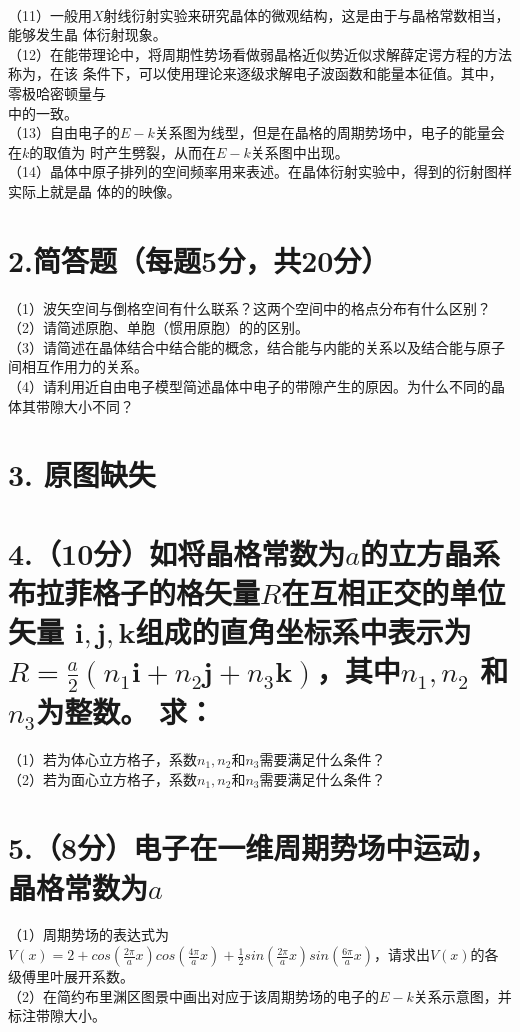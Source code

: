 \documentclass[UTF8]{ctexart}
\begin{document}
\underline{\makebox[3em]{}}\\
（11）一般用$X$射线衍射实验来研究晶体的微观结构，这是由于\underline{\makebox[7em]{}}与晶格常数相当，能够发生晶
体衍射现象。\\
（12）在能带理论中，将周期性势场看做弱晶格近似势近似求解薛定谔方程的方法称为\underline{\makebox[10em]{}}，在该
条件下，可以使用\underline{\makebox[3em]{}}理论来逐级求解电子波函数和能量本征值。其中，零极哈密顿量与\\
\underline{\makebox[12em]{}}中的一致。\\
（13）自由电子的$E-k$关系图为\underline{\makebox[3em]{}}线型，但是在晶格的周期势场中，电子的能量会在$k$的取值为
\underline{\makebox[19em]{}}时产生劈裂，从而在$E-k$关系图中出现\underline{\makebox[3em]{}}。\\
（14）晶体中原子排列的空间频率用\underline{\makebox[4em]{}}来表述。在晶体衍射实验中，得到的衍射图样实际上就是晶
体的\underline{\makebox[4em]{}}的映像。\\
\section*{\bfseries 2.简答题（每题5分，共20分）}
（1）波矢空间与倒格空间有什么联系？这两个空间中的格点分布有什么区别？\\
（2）请简述原胞、单胞（惯用原胞）的的区别。\\
（3）请简述在晶体结合中结合能的概念，结合能与内能的关系以及结合能与原子间相互作用力的关系。\\
（4）请利用近自由电子模型简述晶体中电子的带隙产生的原因。为什么不同的晶体其带隙大小不同？\\
\section*{\bfseries 3. 原图缺失}
\section*{\bfseries 4.（10分）如将晶格常数为$a$的立方晶系布拉菲格子的格矢量$R$在互相正交的单位矢量
$\bm{i},\bm{j},\bm{k}$组成的直角坐标系中表示为$R=\frac{a}{2}(n_1\bm{i}+n_2\bm{j}+n_3\bm{k})$，其中$n_1,n_2$
和$n_3$为整数。 求：}
（1）若为体心立方格子，系数$n_1,n_2$和$n_3$需要满足什么条件？\\
（2）若为面心立方格子，系数$n_1,n_2$和$n_3$需要满足什么条件？\\
\section*{\bfseries 5.（8分）电子在一维周期势场中运动，晶格常数为$a$}
（1）周期势场的表达式为$V(x)=2+cos(\frac{2\pi}{a}x)cos(\frac{4\pi}{a}x)
+\frac{1}{2}sin(\frac{2\pi}{a}x)sin(\frac{6\pi}{a}x)$，请求出$V(x)$的各级傅里叶展开系数。\\
（2）在简约布里渊区图景中画出对应于该周期势场的电子的$E-k$关系示意图，并标注带隙大小。\\
\end{document}
